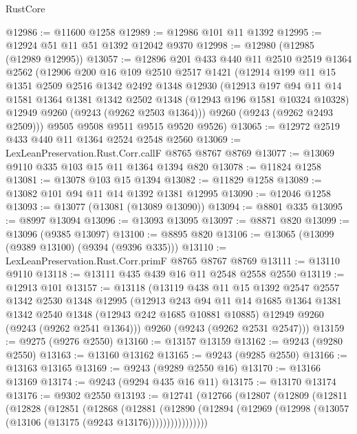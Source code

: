 \begin{lexlean}{RustCore}
\begin{coremodule}
@12986 := @11600 @1258
@12989 := @12986 @101 @11 @1392
@12995 := @12924 @51 @11 @51 @1392 @12042 @9370
@12998 := @12980 (@12985 (@12989 @12995))
@13057 := @12896
    @201
    @433
    @440
    @11
    @2510
    @2519
    @1364
    @2562
    (@12906
      @200
      @16
      @109
      @2510
      @2517
      @1421
      (@12914
        @199
        @11
        @15
        @1351
        @2509
        @2516
        @1342
        @2492
        @1348
        @12930
        (@12913
          @197
          @94
          @11
          @14
          @1581
          @1364
          @1381
          @1342
          @2502
          @1348
          (@12943 @196 @1581 @10324 @10328)
          @12949
          @9260
          (@9243 (@9262 @2503 @1364)))
        @9260
        (@9243 (@9262 @2493 @2509)))
      @9505
      @9508
      @9511
      @9515
      @9520
      @9526)
@13065 := @12972 @2519 @433 @440 @11 @1364 @2524 @2548 @2560
@13069 := LexLeanPreservation.Rust.Corr.callF @8765 @8767 @8769
@13077 := @13069 @9110 @335 @103 @15 @11 @1364 @1394 @820
@13078 := @11824 @1258
@13081 := @13078 @103 @15 @1394
@13082 := @11829 @1258
@13089 := @13082 @101 @94 @11 @14 @1392 @1381 @12995
@13090 := @12046 @1258
@13093 := @13077 (@13081 (@13089 @13090))
@13094 := @8801 @335
@13095 := @8997 @13094
@13096 := @13093 @13095
@13097 := @8871 @820
@13099 := @13096 (@9385 @13097)
@13100 := @8895 @820
@13106 := @13065 (@13099 (@9389 @13100) (@9394 (@9396 @335)))
@13110 := LexLeanPreservation.Rust.Corr.primF @8765 @8767 @8769
@13111 := @13110 @9110
@13118 := @13111 @435 @439 @16 @11 @2548 @2558 @2550
@13119 := @12913 @101
@13157 := @13118
    (@13119
      @438
      @11
      @15
      @1392
      @2547
      @2557
      @1342
      @2530
      @1348
      @12995
      (@12913
        @243
        @94
        @11
        @14
        @1685
        @1364
        @1381
        @1342
        @2540
        @1348
        (@12943 @242 @1685 @10881 @10885)
        @12949
        @9260
        (@9243 (@9262 @2541 @1364)))
      @9260
      (@9243 (@9262 @2531 @2547)))
@13159 := @9275 (@9276 @2550)
@13160 := @13157 @13159
@13162 := @9243 (@9280 @2550)
@13163 := @13160 @13162
@13165 := @9243 (@9285 @2550)
@13166 := @13163 @13165
@13169 := @9243 (@9289 @2550 @16)
@13170 := @13166 @13169
@13174 := @9243 (@9294 @435 @16 @11)
@13175 := @13170 @13174
@13176 := @9302 @2550
@13193 := @12741
    (@12766
      (@12807
        (@12809
          (@12811
            (@12828
              (@12851
                (@12868
                  (@12881
                    (@12890
                      (@12894 (@12969 (@12998 (@13057 (@13106 (@13175 (@9243 @13176))))))))))))))))

\end{coremodule}
\end{lexlean}
